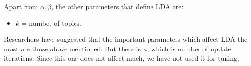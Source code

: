 \documentclass[10pt,conference]{IEEEtran}
\newcommand{\bi}{\begin{itemize}}
\newcommand{\ei}{\end{itemize}}
\newcommand{\be}{\begin{enumerate}}
\newcommand{\ee}{\end{enumerate}}
\theoremstyle{break}
\begin{document}
Apart from $\alpha,\beta$, the other parameters that define LDA
are:
\bi
\item $k$ = number of topics.
\ei
Researchers have suggested that the important parameters which affect LDA the most are those above mentioned. But there is $u$, which is number of update iterations. Since this one does not affect much, we have not used it for tuning.


\begin{figure}[!t]
  
  


\scriptsize
\begin{center}
\begin{tabular}{c|c|c|c|c}
 

\end{tabular}
\end{center}
\end{figure}
\end{document}
